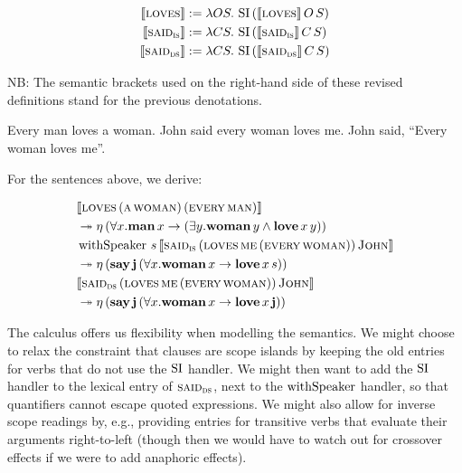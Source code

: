 \documentclass{llncs}
\begin{document}
\begin{align*}
  \llbracket \textsc{loves} \rrbracket &:= \lambda O S.\, \operatorname{SI}\,(\llbracket \textsc{loves} \rrbracket\,O\,S) \\
  \llbracket \textsc{said}_{\textsc{is}} \rrbracket &:= \lambda C S.\, \operatorname{SI}\,(\llbracket \textsc{said}_{\textsc{is}} \rrbracket\,C\,S) \\
  \llbracket \textsc{said}_{\textsc{ds}} \rrbracket &:= \lambda C S.\, \operatorname{SI}\,(\llbracket \textsc{said}_{\textsc{ds}} \rrbracket\,C\,S)
\end{align*}

NB: The semantic brackets used on the right-hand side of these revised
definitions stand for the previous denotations.

\begin{exe}
  \ex Every man loves a woman.
  \ex John said every woman loves me.
  \ex John said, ``Every woman loves me''.
\end{exe}

For the sentences above, we derive:

\begin{align}
  & \llbracket \textsc{loves}\,(\textsc{a}\,\textsc{woman})\,(\textsc{every}\,\textsc{man}) \rrbracket \nonumber \\
  & \twoheadrightarrow \eta\,(\forall x. \textbf{man}\,x \to (\exists y. \textbf{woman}\,y \land \textbf{love}\,x\,y)) \\
  & \operatorname{withSpeaker}\,s\,\llbracket \textsc{said}_{\textsc{is}}\,(\textsc{loves}\,\textsc{me}\,(\textsc{every}\,\textsc{woman}))\,\textsc{John} \rrbracket \nonumber \\
  & \twoheadrightarrow \eta\,(\textbf{say}\,\textbf{j}\,(\forall x. \textbf{woman}\,x \to \textbf{love}\,x\,s)) \\
  & \llbracket \textsc{said}_{\textsc{ds}}\,(\textsc{loves}\,\textsc{me}\,(\textsc{every}\,\textsc{woman}))\,\textsc{John} \rrbracket \nonumber \\
  & \twoheadrightarrow \eta\,(\textbf{say}\,\textbf{j}\,(\forall x. \textbf{woman}\,x \to \textbf{love}\,x\,\textbf{j}))
\end{align}

The calculus offers us flexibility when modelling the semantics. We might
choose to relax the constraint that clauses are scope islands by keeping
the old entries for verbs that do not use the $\operatorname{SI}$ handler. We might then
want to add the $\operatorname{SI}$ handler to the lexical entry of
$\textsc{said}_{\textsc{ds}}$, next to the $\operatorname{withSpeaker}$ handler, so that
quantifiers cannot escape quoted expressions. We might also allow for
inverse scope readings by, e.g., providing entries for transitive verbs
that evaluate their arguments right-to-left (though then we would have to
watch out for crossover effects if we were to add anaphoric effects).
\end{document}
